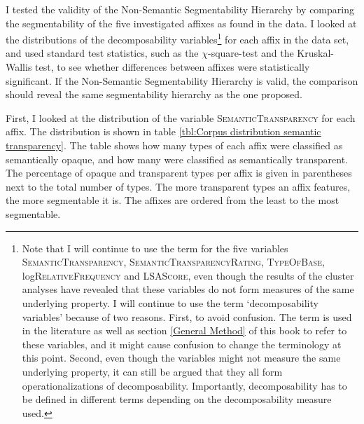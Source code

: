 I tested the validity of the Non-Semantic Segmentability Hierarchy by comparing the segmentability of the five investigated affixes as found in the data. I looked at the distributions of the decomposability variables\footnote{Note that I will continue to use the term  for the five variables \textsc{SemanticTransparency}, \textsc{SemanticTransparencyRating}, \textsc{TypeOfBase}, log\textsc{RelativeFrequency} and \textsc{LSAScore}, even though the results of the cluster analyses have revealed that these variables do not form measures of the same underlying property. I will continue to use the term `decomposability variables' because of two reasons. First, to avoid confusion. The term is used in the literature as well as section \ref{General Method} of this book to refer to these variables, and it might cause confusion to change the terminology at this point. Second, even though the variables might not measure the same underlying property, it can still be argued that they all form operationalizations of decomposability. Importantly, decomposability has to be defined in different terms depending on the decomposability measure used.} for each affix in the data set, and used standard test statistics, such as the $\chi$-square-test and the Kruskal-Wallis test, to see whether differences between affixes were statistically significant.
If the Non-Semantic Segmentability Hierarchy is valid, the comparison should reveal the same segmentability hierarchy  as the one proposed. 


First, I looked at the distribution of the variable \textsc{SemanticTransparency} for each affix. The distribution is shown in table \ref{tbl:Corpus distribution semantic transparency}. The table shows how many types of each affix were classified as semantically opaque, and how many were classified as semantically transparent. The percentage of opaque and transparent types per affix is given in parentheses next to the total number of  types. The more transparent types an affix features, the more segmentable it is. The affixes are ordered from the least to the most segmentable.




